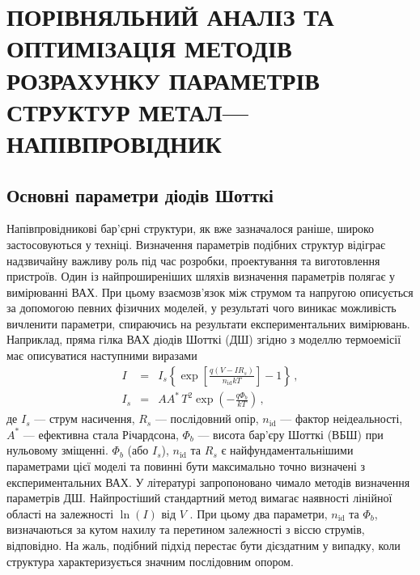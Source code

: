 \chapter{\MakeUppercase{Порівняльний аналіз та оптимізація методів розрахунку параметрів структур метал---напівпровідник}\label{Ch_MSMethod}}


\section{Основні параметри діодів Шотткі}
Напівпровідникові бар'єрні структури, як вже зазначалося раніше, широко застосовуються у техніці.
Визначення параметрів подібних структур відіграє надзвичайну важливу роль під час розробки, проектування та виготовлення пристроїв.
Один із найпроширеніших шляхів визначення параметрів полягає у вимірюванні ВАХ.
При цьому взаємозв'язок між струмом та напругою описується за допомогою певних фізичних моделей, у
результаті чого виникає можливість вичленити параметри, спираючись на результати експериментальних вимірювань.
Наприклад, пряма гілка ВАХ діодів Шотткі (ДШ) згідно з моделлю термоемісії має описуватися \cite{Rhoderick1988} наступними виразами
\begin{eqnarray}
\label{eqSDIV}
I&=&I_s\left\{\exp\left[\frac{q(V-IR_s)}{n_\mathrm{id}kT}\right]-1\right\}\,,\\
\label{eqSDIs}
I_s&=&AA^*\,T^2\exp\left(-\frac{q\Phi_b}{kT}\right)\,,
\end{eqnarray}
де
$I_s$ --- струм насичення,
$R_s$ --- послідовний опір,
$n_\mathrm{id}$ --- фактор неідеальності,
$A^*$ --- ефективна стала Річардсона,
$\Phi_b$ --- висота бар'єру Шотткі (ВБШ) при нульовому зміщенні.
$\Phi_b$ (або $I_s$), $n_\mathrm{id}$ та $R_s$ є найфундаментальнішими параметрами цієї моделі та повинні бути максимально точно визначені з експериментальних ВАХ.
У літературі запропоновано чимало методів визначення параметрів ДШ.
Найпростіший стандартний метод вимагає наявності лінійної області на залежності $\ln(I)$ від  $V$ \cite{Sze2012,Rhoderick1988}.
При цьому два параметри, $n_\mathrm{id}$ та $\Phi_b$, визначаються за кутом нахилу та перетином  залежності з віссю струмів, відповідно.
На жаль, подібний підхід перестає бути дієздатним у випадку, коли структура характеризується значним послідовним опором.
